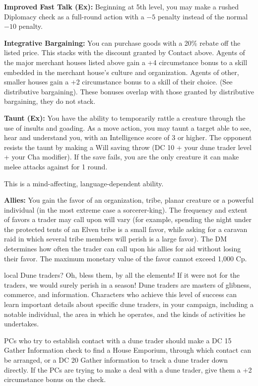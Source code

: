 {\textbf{Improved Fast Talk (Ex):} Beginning at 5th level, you may make a rushed Diplomacy check as a full-round action with a $-5$ penalty instead of the normal $-10$ penalty.

\textbf{Integrative Bargaining:} You can purchase goods with a 20\% rebate off the listed price. This stacks with the discount granted by Contact above. Agents of the major merchant houses listed above gain a +4 circumstance bonus to a skill embedded in the merchant house’s culture and organization. Agents of other, smaller houses gain a +2 circumstance bonus to a skill of their choice. (See distributive bargaining). These bonuses overlap with those granted by distributive bargaining, they do not stack.

\textbf{Taunt (Ex):} You have the ability to temporarily rattle a creature through the use of insults and goading. As a move action, you may taunt a target able to see, hear and understand you, with an Intelligence score of 3 or higher. The opponent resists the taunt by making a Will saving throw (DC 10 + your dune trader level + your Cha modifier). If the save fails, you are the only creature it can make melee attacks against for 1 round.

This is a mind-affecting, language-dependent ability.

\textbf{Allies:} You gain the favor of an organization, tribe, planar creature or a powerful individual (in the most extreme case a sorcerer-king). The frequency and extent of favors a trader may call upon will vary (for example, spending the night under the protected tents of an Elven tribe is a small favor, while asking for a caravan raid in which several tribe members will perish is a large favor). The DM determines how often the trader can call upon his allies for aid without losing their favor. The maximum monetary value of the favor cannot exceed 1,000 Cp.
}
{}
{local}
{Dune traders? Oh, bless them, by all the elements! If it were not for the traders, we would surely perish in a season!}
{Dune traders are masters of glibness, commerce, and information.}
{Characters who achieve this level of success can learn important details about specific dune traders, in your campaign, including a notable individual, the area in which he operates, and the kinds of activities he undertakes.}

PCs who try to establish contact with a dune trader should make a DC 15 Gather Information check to find a House Emporium, through which contact can be arranged, or a DC 20 Gather information to track a dune trader down directly. If the PCs are trying to make a deal with a dune trader, give them a +2 circumstance bonus on the check.